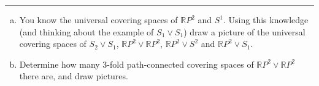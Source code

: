 \documentclass[letterpaper, 12pt]{article}
\begin{document}
\noindent\rule{7in}{2.8pt}
\begin{problem}{3}
\begin{enumerate}[(a)]
\item You know the universal covering spaces of \(\mathbb{R}P^2\) and \(S^1\). Using this knowledge (and thinking about the example of \(S_1\vee S_1\)) draw a picture of the universal covering spaces of 
\(S_2\vee S_1\), \(\mathbb{R}P^2\vee \mathbb{R}P^2\), \(\mathbb{R}P^2\vee S^2\) and \(\mathbb{R}P^2\vee S_1\). 
\item Determine how many 3-fold path-connected covering spaces of \(\mathbb{R}P^2\vee \mathbb{R}P^2\) there are, and draw pictures.
\end{enumerate}
\end{problem}
\end{document}
